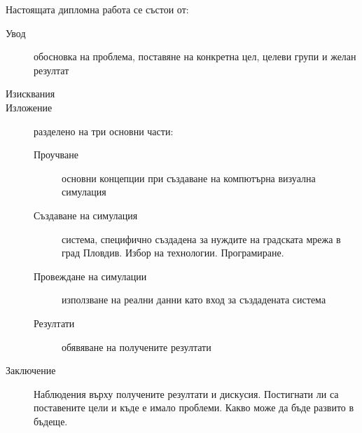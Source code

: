 		Настоящата дипломна работа се състои от:
	
		\begin{description}
			\item[Увод] обосновка на проблема, поставяне на конкретна цел, целеви групи и желан резултат
			\item[Изисквания]
			\item[Изложение] разделено на три основни части:
			\begin{description}			
				\item[Проучване] основни концепции при създаване на компютърна визуална симулация
				\item[Създаване на симулация] система, специфично създадена за нуждите на градската мрежа в град Пловдив. 
				Избор на технологии. Програмиране.
				\item[Провеждане на симулации] използване на реални данни като вход за създадената система
				\item[Резултати] обявяване на получените резултати			
			\end{description}		
			\item[Заключение] Наблюдения върху получените резултати и дискусия. 
			Постигнати ли са поставените цели и къде е имало проблеми. Какво може да бъде развито в бъдеще.
		\end{description}